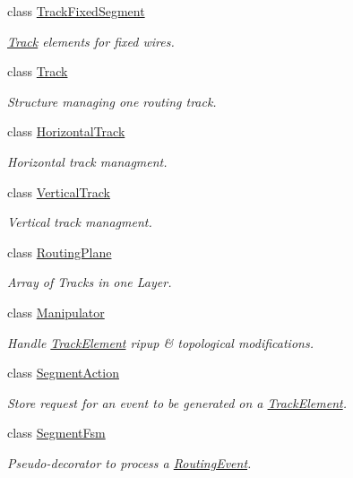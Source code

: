 \begin{DoxyCompactItemize}
class \hyperlink{classKite_1_1TrackFixedSegment}{Track\-Fixed\-Segment}
\begin{DoxyCompactList}\small\item\em \hyperlink{classKite_1_1Track}{Track} elements for fixed wires. \end{DoxyCompactList}\item 
class \hyperlink{classKite_1_1Track}{Track}
\begin{DoxyCompactList}\small\item\em Structure managing one routing track. \end{DoxyCompactList}\item 
class \hyperlink{classKite_1_1HorizontalTrack}{Horizontal\-Track}
\begin{DoxyCompactList}\small\item\em Horizontal track managment. \end{DoxyCompactList}\item 
class \hyperlink{classKite_1_1VerticalTrack}{Vertical\-Track}
\begin{DoxyCompactList}\small\item\em Vertical track managment. \end{DoxyCompactList}\item 
class \hyperlink{classKite_1_1RoutingPlane}{Routing\-Plane}
\begin{DoxyCompactList}\small\item\em Array of Tracks in one Layer. \end{DoxyCompactList}\item 
class \hyperlink{classKite_1_1Manipulator}{Manipulator}
\begin{DoxyCompactList}\small\item\em Handle \hyperlink{classKite_1_1TrackElement}{Track\-Element} ripup \& topological modifications. \end{DoxyCompactList}\item 
class \hyperlink{classKite_1_1SegmentAction}{Segment\-Action}
\begin{DoxyCompactList}\small\item\em Store request for an event to be generated on a \hyperlink{classKite_1_1TrackElement}{Track\-Element}. \end{DoxyCompactList}\item 
class \hyperlink{classKite_1_1SegmentFsm}{Segment\-Fsm}
\begin{DoxyCompactList}\small\item\em Pseudo-\/decorator to process a \hyperlink{classKite_1_1RoutingEvent}{Routing\-Event}. \end{DoxyCompactList}\item 

\end{DoxyCompactItemize}
